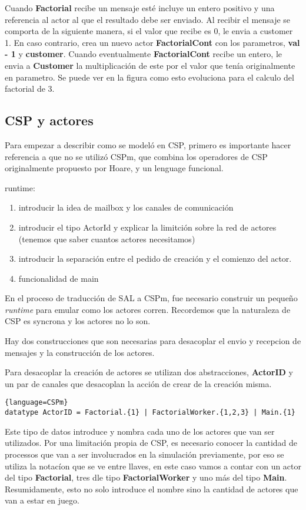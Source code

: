 \documentclass[fleqn]{article}
\begin{document}
Cuando \textbf{Factorial} recibe un mensaje esté incluye un entero positivo y
una referencia al actor al que el resultado debe ser enviado. Al recibir el
mensaje se comporta de la siguiente manera, si el valor que recibe es 0, le
envia a customer 1. En caso contrario, crea un nuevo actor
\textbf{FactorialCont} con los parametros, \textbf{val - 1} y \textbf{customer}.
Cuando eventualmente \textbf{FactorialCont} recibe un entero, le envia a
\textbf{Customer} la multiplicación de este por el valor que tenía originalmente
en parametro. Se puede ver en la figura como esto evoluciona para el calculo del
factorial de 3.

\subsection{CSP y actores}
Para empezar a describir como se modeló en CSP, primero es importante hacer
referencia a que no se utilizó CSPm, que combina los operadores de CSP
originalmente propuesto por Hoare, y un lenguage funcional.


runtime: 
\begin{enumerate}
\item  introducir la idea de mailbox y los canales de comunicación
\item introducir el tipo ActorId y explicar la limitción sobre la red de actores
(tenemos que saber cuantos actores necesitamos)
\item introducir la separación entre el pedido de creación y el comienzo del actor.
\item funcionalidad de main
\end{enumerate}

En el proceso de traducción de SAL a CSPm, fue necesario construir un pequeño
\textit{runtime} para emular como los actores corren. Recordemos que la
naturaleza de CSP es syncrona y los actores no lo son.

Hay dos construcciones que son necesarias para desacoplar el envio y recepcion
de mensajes y la construcción de los actores.

Para desacoplar la creación de actores se utilizan dos abstracciones,
\textbf{ActorID} y un par de canales que desacoplan la acción de crear de la
creación misma.

\begin{lstlisting}{language=CSPm}
datatype ActorID = Factorial.{1} | FactorialWorker.{1,2,3} | Main.{1}
\end{lstlisting}

Este tipo de datos introduce y nombra cada uno de los actores que van ser
utilizados. Por una limitación propia de CSP, es necesario conocer la cantidad de processos
que van a ser involucrados en la simulación previamente, por eso se utiliza la
notacíon que se ve entre llaves, en este caso vamos a contar con un actor del
tipo \textbf{Factorial}, tres dle tipo \textbf{FactorialWorker} y uno más del
tipo \textbf{Main}. Resumidamente, esto no solo introduce el nombre sino la
cantidad de actores que van a estar en juego.
\end{document}
